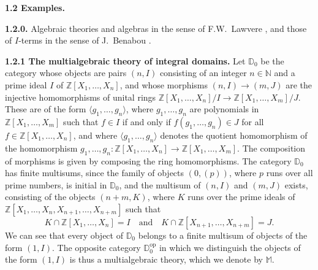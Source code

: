\documentclass{article}
\newenvironment{rmenv}[1]
  {\phantomsection\par\medskip\noindent\textbf{#1.}\rmfamily}
  {\medskip}
\newcommand{\bb}[1]{{\mathbb{#1}}}
\newcommand{\op}{{\mathrm{op}}}
\begin{document}
\begin{rmenv}{1.2 Examples}
\label{1.2}

  \begin{rmenv}{1.2.0}
    Algebraic theories and algebras in the sense of F.W.~Lawvere \cite{6}, and those of $I$-terms in the sense of J.~Benabou \cite{1}.
  \end{rmenv}

  \begin{rmenv}{1.2.1 The multialgebraic theory of integral domains}
    Let $\bb{D}_0$ be the category whose objects are pairs $(n,I)$ consisting of an integer $n\in\bb{N}$ and a prime ideal $I$ of $\bb{Z}[X_1,\ldots,X_n]$, and whose morphisms $(n,I)\to(m,J)$ are the injective homomorphisms of unital rings $\bb{Z}[X_1,\ldots,X_n]/I\to\bb{Z}[X_1,\ldots,X_m]/J$.
    These are of the form $\langle g_1,\ldots,g_n\rangle$, where $g_1,\ldots,g_n$ are polynomials in $\bb{Z}[X_1,\ldots,X_m]$ such that $f\in I$ if and only if $f(g_1,\ldots,g_n)\in J$ for all $f\in\bb{Z}[X_1,\ldots,X_n]$, and where $\langle g_1,\ldots,g_n\rangle$ denotes the quotient homomorphism of the homomorphism $g_1,\ldots,g_n\colon\bb{Z}[X_1,\ldots,X_n]\to\bb{Z}[X_1,\ldots,X_m]$.
    The composition of morphisms is given by composing the ring homomorphisms.
    The category $\bb{D}_0$ has finite multisums, since the family of objects $(0,(p))$, where $p$ runs over all prime numbers, is initial in $\bb{D}_0$, and the multisum of $(n,I)$ and $(m,J)$ exists, consisting of the objects $(n+m,K)$, where $K$ runs over the prime ideals of $\bb{Z}[X_1,\ldots,X_n,X_{n+1},\ldots,X_{n+m}]$ such that
    \[
      K\cap\bb{Z}[X_1,\ldots,X_n] = I
      \quad\text{and}\quad
      K\cap\bb{Z}[X_{n+1},\ldots,X_{n+m}] = J.
    \]
    We can see that every object of $\bb{D}_0$ belongs to a finite multisum of objects of the form $(1,I)$.
    The opposite category $\bb{D}_0^\op$ in which we distinguish the objects of the form $(1,I)$ is thus a multialgebraic theory, which we denote by $\bb{M}$.


\end{rmenv}
\end{rmenv}
\end{document}
